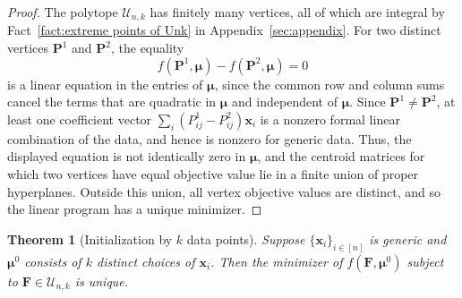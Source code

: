 \documentclass{article}
\theoremstyle{plain}
\newtheorem{theorem}{Theorem}
\theoremstyle{definition}
\newcommand{\1}{\mathbf{1}}
\newcommand{\bUnk}{\mathcal{U}_{n,k}}
\newcommand{\bmF}{\bm{F}}
\newcommand{\bmu}{\bm{\mu}}
\begin{document}
\begin{proof}
The polytope $\bUnk$ has finitely many vertices, all of which are integral by Fact~\ref{fact:extreme points of Unk} in Appendix~\ref{sec:appendix}.
For two distinct vertices $\bm{P}^1$ and $\bm{P}^2$, the equality
\[
f(\bm{P}^1,\bmu)-f(\bm{P}^2,\bmu)=0
\]
is a linear equation in the entries of $\bmu$, since the common row and column sums cancel the terms that are quadratic in $\bmu$ and independent of $\bmu$.
Since $\bm{P}^1\neq\bm{P}^2$, at least one coefficient vector $\sum_i(P^1_{ij}-P^2_{ij})\bm{x}_i$ is a nonzero formal linear combination of the data, and hence is nonzero for generic data.
Thus, the displayed equation is not identically zero in $\bmu$, and the centroid matrices for which two vertices have equal objective value lie in a finite union of proper hyperplanes.
Outside this union, all vertex objective values are distinct, and so the linear program has a unique minimizer.
\end{proof}
\begin{theorem}[Initialization by $k$ data points]
Suppose $\{\bm{x}_i\}_{i\in[n]}$ is generic and $\bmu^0$ consists of $k$ distinct choices of $\bm{x}_{i}$.
Then the minimizer of $f(\bmF,\bmu^0)$ subject to $\bmF\in\bUnk$ is unique. 
    \label{thm: generic k points initialization}
\end{theorem}
\end{document}
